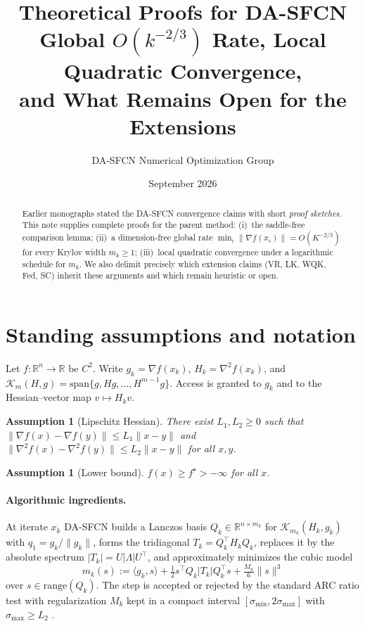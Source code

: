 \documentclass[11pt,a4paper]{article}
\title{\textbf{Theoretical Proofs for DA-SFCN}\\
\large Global $O(k^{-2/3})$ Rate, Local Quadratic Convergence,\\
and What Remains Open for the Extensions}
\author{DA-SFCN Numerical Optimization Group}
\date{September 2026}
\newtheorem{assumption}[theorem]{Assumption}
\theoremstyle{definition}
\begin{document}
\maketitle

\begin{abstract}
Earlier monographs stated the DA-SFCN convergence claims with short
\emph{proof sketches}. This note supplies complete proofs for the parent
method: (i)~the saddle-free comparison lemma; (ii)~a dimension-free global
rate $\min_i\|\nabla f(x_i)\|=O(K^{-2/3})$ for every Krylov width
$m_k\ge 1$; (iii)~local quadratic convergence under a logarithmic schedule
for $m_k$. We also delimit precisely which extension claims (VR, LK, WQK,
Fed, SC) inherit these arguments and which remain heuristic or open.
\end{abstract}

\section{Standing assumptions and notation}
Let $f:\mathbb{R}^n\to\mathbb{R}$ be $C^2$. Write
$g_k=\nabla f(x_k)$, $H_k=\nabla^2 f(x_k)$, and
$\mathcal{K}_m(H,g)=\mathrm{span}\{g,Hg,\dots,H^{m-1}g\}$.
Access is granted to $g_k$ and to the Hessian--vector map $v\mapsto H_k v$.

\begin{assumption}[Lipschitz Hessian]\label{ass:lip}
There exist $L_1,L_2\ge 0$ such that
$\|\nabla f(x)-\nabla f(y)\|\le L_1\|x-y\|$ and
$\|\nabla^2 f(x)-\nabla^2 f(y)\|\le L_2\|x-y\|$ for all $x,y$.
\end{assumption}

\begin{assumption}[Lower bound]\label{ass:bound}
$f(x)\ge f^\star>-\infty$ for all $x$.
\end{assumption}

\paragraph{Algorithmic ingredients.}
At iterate $x_k$ DA-SFCN builds a Lanczos basis $Q_k\in\mathbb{R}^{n\times m_k}$
for $\mathcal{K}_{m_k}(H_k,g_k)$ with $q_1=g_k/\|g_k\|$, forms the
tridiagonal $T_k=Q_k^\top H_k Q_k$, replaces it by the absolute
spectrum $|T_k|=U|\Lambda|U^\top$, and approximately minimizes the cubic model
\begin{equation}\label{eq:model}
m_k(s)
:=
\langle g_k,s\rangle+\tfrac12 s^\top Q_k|T_k|Q_k^\top s+\tfrac{M_k}{6}\|s\|^3
\end{equation}
over $s\in\mathrm{range}(Q_k)$. The step is accepted or rejected by the
standard ARC ratio test with regularization $M_k$ kept in a compact interval
$[\sigma_{\min},2\sigma_{\max}]$ with $\sigma_{\max}\ge L_2$
\cite{cartis2011,nesterov2006}.
\end{document}
